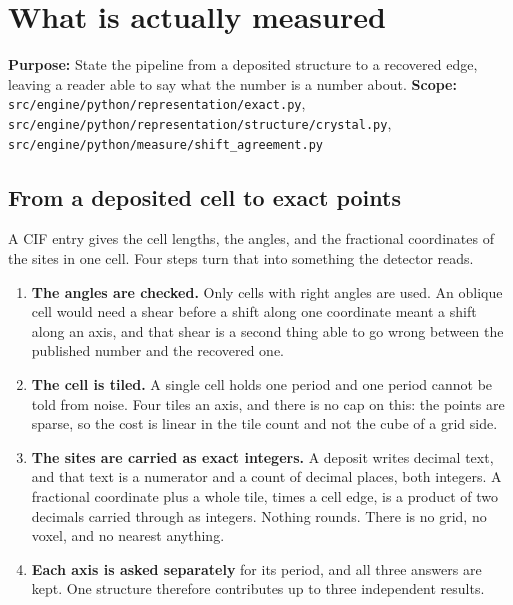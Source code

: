 \chapter{What is actually measured}

\textbf{Purpose:} State the pipeline from a deposited structure to a recovered edge, leaving a reader able to say what the number is a number about.
\textbf{Scope:} \texttt{src/\allowbreak{}engine/\allowbreak{}python/\allowbreak{}representation/\allowbreak{}exact.\allowbreak{}py}, \texttt{src/\allowbreak{}engine/\allowbreak{}python/\allowbreak{}representation/\allowbreak{}structure/\allowbreak{}crystal.\allowbreak{}py}, \texttt{src/\allowbreak{}engine/\allowbreak{}python/\allowbreak{}measure/\allowbreak{}shift\_\allowbreak{}agreement.\allowbreak{}py}

\section{From a deposited cell to exact points}

A CIF entry gives the cell lengths, the angles, and the fractional coordinates of the sites in one cell. Four steps turn that into something the detector reads.

\begin{enumerate}
\item \textbf{The angles are checked.} Only cells with right angles are used. An oblique cell would need a shear before a shift along one coordinate meant a shift along an axis, and that shear is a second thing able to go wrong between the published number and the recovered one.
\item \textbf{The cell is tiled.} A single cell holds one period and one period cannot be told from noise. Four tiles an axis, and there is no cap on this: the points are sparse, so the cost is linear in the tile count and not the cube of a grid side.
\item \textbf{The sites are carried as exact integers.} A deposit writes decimal text, and that text is a numerator and a count of decimal places, both integers. A fractional coordinate plus a whole tile, times a cell edge, is a product of two decimals carried through as integers. Nothing rounds. There is no grid, no voxel, and no nearest anything.
\item \textbf{Each axis is asked separately} for its period, and all three answers are kept. One structure therefore contributes up to three independent results.
\end{enumerate}

